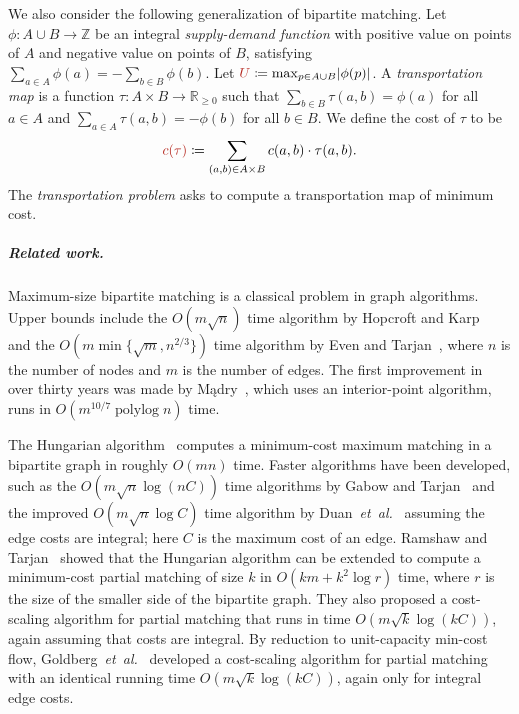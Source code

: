 \documentclass[a4paper,UKenglish,nolineno]{socg-lipics-v2019}
\def\etal{\emph{et~al.}}
\def\etal{\textit{et~al.}}
\def\polylog{\mathop{\mathrm{polylog}}}
\def\reals{\mathbb{R}}
\def\ints{\mathbb{Z}}
\def\abs#1{\mathopen| #1 \mathclose|}		%
\def\tsupply{\phi}
\def\cost{c}
\def\EMPH#1{\textcolor{BrickRed}{{\emph{#1}}}}
\begin{document}
We also consider the following generalization of bipartite matching.
Let $\tsupply:A \cup B \to \ints$ be an integral \EMPH{supply-demand function} with
positive value on points of $A$ and negative value on points of $B$, satisfying
$\sum_{a \in A} \tsupply(a) = - \sum_{b \in B} \tsupply(b)$.
Let $\EMPH{$U$} \coloneqq \max_{p \in A \cup B} \abs{\tsupply(p)}$.
A \EMPH{transportation map} is a function $\tau: A \times B \to \reals_{\geq 0}$
such that $\sum_{b \in B} \tau(a, b) = \tsupply(a)$ for all $a \in A$ and
$\sum_{a \in A} \tau(a, b) = -\tsupply(b)$ for all $b \in B$.
We define the cost of $\tau$ to be
\begin{equation*}
	\EMPH{$\cost(\tau)$} \coloneqq \sum_{(a, b) \in A \times B} c(a, b) \cdot \tau(a, b).
\end{equation*}
The \EMPH{transportation problem} asks to compute a transportation map of minimum cost.


\subparagraph{Related work.}
Maximum-size bipartite matching is a classical problem in graph algorithms.
Upper bounds include the $O(m\sqrt{n})$ time algorithm by
Hopcroft and Karp~\cite{HK73} and the $O(m \min\{\sqrt{m}, n^{2/3}\})$ time
algorithm by Even and Tarjan~\cite{ET75}, where $n$ is the
number of nodes and $m$ is the number of edges.
The first improvement in over thirty years was made by M{\k a}dry~\cite{M13},
which uses an interior-point algorithm, runs in $O(m^{10/7}\polylog n)$ time.

The Hungarian algorithm~\cite{Kuhn55} computes a minimum-cost maximum matching
in a bipartite graph in roughly $O(mn)$ time.
Faster algorithms have been developed,
such as the $O(m\sqrt{n}\log(nC))$ time algorithms by Gabow and
Tarjan~\cite{GT89} and the improved $O(m\sqrt{n}\log C)$ time algorithm by
Duan~\etal~\cite{DPS18} assuming the edge costs are integral;
here $C$ is the maximum cost of an edge.
Ramshaw and Tarjan~\cite{RT12} showed that the Hungarian algorithm can be extended to compute a minimum-cost partial
matching of size $k$ in $O(km + k^2\log r)$ time, where $r$ is the size of the smaller side of the bipartite graph.
They also proposed a cost-scaling algorithm for partial
matching that runs in time $O(m\sqrt{k}\log(kC))$, again assuming that costs
are integral.
By reduction to unit-capacity min-cost flow, Goldberg~\etal~\cite{GHKT17}
developed a cost-scaling algorithm for partial matching with an identical running time
$O(m\sqrt{k}\log(kC))$,
again only for integral edge costs.
\end{document}
